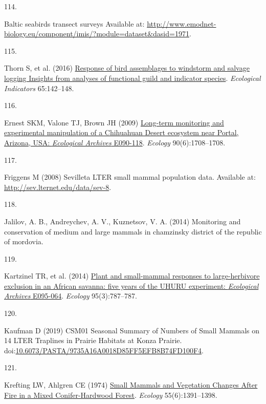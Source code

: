 \documentclass{article}
\newlength{\cslhangindent}
\newlength{\csllabelwidth}
\newlength{\cslentryspacingunit} %
\newenvironment{CSLReferences}[2] %
 {%
  \setlength{\parindent}{0pt}
  \ifodd #1
  \let\oldpar\par
  \def\par{\hangindent=\cslhangindent\oldpar}
  \fi
  \setlength{\parskip}{#2\cslentryspacingunit}
 }%
 {}
\newcommand{\CSLLeftMargin}[1]{\parbox[t]{\csllabelwidth}{#1}}
\newcommand{\CSLRightInline}[1]{\parbox[t]{\linewidth - \csllabelwidth}{#1}\break}
\begin{document}
\begin{CSLReferences}{0}{0}
\leavevmode{}%
\CSLLeftMargin{114. }%
\CSLRightInline{Baltic seabirds transect surveys Available at:
\url{http://www.emodnet-biology.eu/component/imis/?module=dataset\&dasid=1971}.}

\leavevmode{}%
\CSLLeftMargin{115. }%
\CSLRightInline{Thorn S, et al. (2016)
\href{https://doi.org/10.1016/j.ecolind.2015.06.033}{Response of bird
assemblages to windstorm and salvage logging {\textemdash} Insights from
analyses of functional guild and indicator species}. \emph{Ecological
Indicators} 65:142--148.}

\leavevmode{}%
\CSLLeftMargin{116. }%
\CSLRightInline{Ernest SKM, Valone TJ, Brown JH (2009)
\href{https://doi.org/10.1890/08-1222.1}{Long-term monitoring and
experimental manipulation of a Chihuahuan Desert ecosystem near Portal,
Arizona, USA: {\emph{Ecological Archives}} E090-118}. \emph{Ecology}
90(6):1708--1708.}

\leavevmode{}%
\CSLLeftMargin{117. }%
\CSLRightInline{Friggens M (2008) Sevilleta LTER small mammal population
data. Available at: \url{http://sev.lternet.edu/data/sev-8}.}

\leavevmode{}%
\CSLLeftMargin{118. }%
\CSLRightInline{Jalilov, A. B., Andreychev, A. V., Kuznetsov, V. A.
(2014) Monitoring and conservation of medium and large mammals in
chamzinsky district of the republic of mordovia.}

\leavevmode{}%
\CSLLeftMargin{119. }%
\CSLRightInline{Kartzinel TR, et al. (2014)
\href{https://doi.org/10.1890/13-1023R.1}{Plant and small-mammal
responses to large-herbivore exclusion in an African savanna: five years
of the UHURU experiment: {\emph{Ecological Archives}} E095-064}.
\emph{Ecology} 95(3):787--787.}

\leavevmode{}%
\CSLLeftMargin{120. }%
\CSLRightInline{Kaufman D (2019) CSM01 Seasonal Summary of Numbers of
Small Mammals on 14 LTER Traplines in Prairie Habitats at Konza Prairie.
doi:\href{https://doi.org/10.6073/PASTA/9735A16A0018D85FF5EFB8B74FD100F4}{10.6073/PASTA/9735A16A0018D85FF5EFB8B74FD100F4}.}

\leavevmode{}%
\CSLLeftMargin{121. }%
\CSLRightInline{Krefting LW, Ahlgren CE (1974)
\href{https://doi.org/10.2307/1935467}{Small Mammals and Vegetation
Changes After Fire in a Mixed Conifer-Hardwood Forest}. \emph{Ecology}
55(6):1391--1398.}


\end{CSLReferences}
\end{document}
